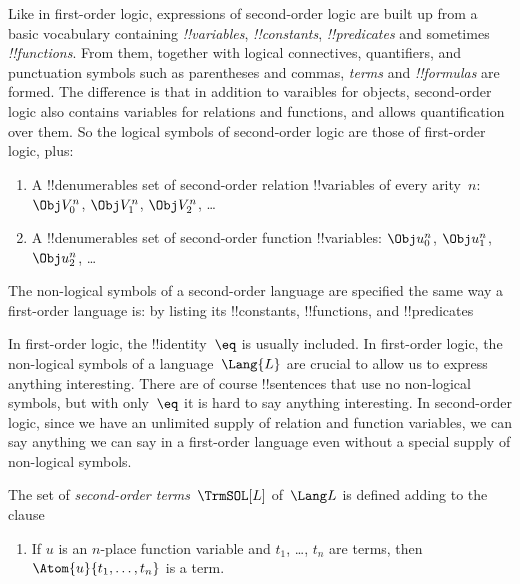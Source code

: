 \documentclass[../../../include/open-logic-section]{subfiles}
\begin{document}


Like in first-order logic, expressions of second-order logic are built
up from a basic vocabulary containing \emph{!!{variable}s},
\emph{!!{constant}s}, \emph{!!{predicate}s} and sometimes
\emph{!!{function}s}.  From them, together with logical connectives,
quantifiers, and punctuation symbols such as parentheses and commas,
\emph{terms} and \emph{!!{formula}s} are formed.  The difference is
that in addition to varaibles for objects, second-order logic also
contains variables for relations and functions, and allows
quantification over them. So the logical symbols of second-order logic
are those of first-order logic, plus:

\begin{enumerate}
\item A !!{denumerable}s set of second-order relation !!{variable}s of
  every arity~$n$: $\Obj V_0^n$, $\Obj V_1^n$, $\Obj V_2^n$, \dots
\item A !!{denumerable}s set of second-order function !!{variable}s:
  $\Obj u_0^n$, $\Obj u_1^n$, $\Obj u_2^n$, \dots
\end{enumerate}

\begin{explain}
The non-logical symbols of a second-order language are specified the
same way a first-order language is: by listing its !!{constant}s,
!!{function}s, and !!{predicate}s

In first-order logic, the !!{identity}~$\eq$ is usually included. In
first-order logic, the non-logical symbols of a language~$\Lang{L}$
are crucial to allow us to express anything interesting. There are of
course !!{sentence}s that use no non-logical symbols, but with
only~$\eq$ it is hard to say anything interesting.  In second-order
logic, since we have an unlimited supply of relation and function
variables, we can say anything we can say in a first-order language
even without a special supply of non-logical symbols.
\end{explain}

\begin{defn}
The set of \emph{second-order terms}~$\TrmSOL[L]$ of~$\Lang L$ is
defined adding to  the clause
\begin{enumerate}
\item If $u$ is an $n$-place function variable and $t_1$, \dots, $t_n$
  are terms, then $\Atom{u}{t_1, \ldots, t_n}$ is a term.
\end{enumerate}
\end{defn}
\end{document}

